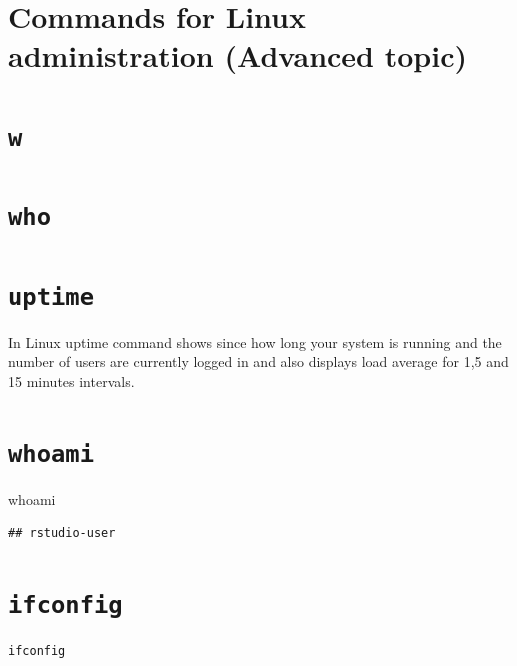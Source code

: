 \documentclass[]{book}
\makeatletter
\newenvironment{Shaded}{\begin{snugshade}}{\end{snugshade}}
\newcommand{\FunctionTok}[1]{\textcolor[rgb]{0.00,0.00,0.00}{#1}}
\newenvironment{kframe}{%
\medskip{}
\setlength{\fboxsep}{.8em}
 \def\at@end@of@kframe{}%
 \ifinner\ifhmode%
  \def\at@end@of@kframe{\end{minipage}}%
  \begin{minipage}{\columnwidth}%
 \fi\fi%
 \def\FrameCommand##1{\hskip\@totalleftmargin \hskip-\fboxsep
 \colorbox{shadecolor}{##1}\hskip-\fboxsep
     \hskip-\linewidth \hskip-\@totalleftmargin \hskip\columnwidth}%
 \MakeFramed {\advance\hsize-\width
   \@totalleftmargin\z@ \linewidth\hsize
   \@setminipage}}%
 {\par\unskip\endMakeFramed%
 \at@end@of@kframe}
\renewenvironment{Shaded}{\begin{kframe}}{\end{kframe}}
\makeatother
\begin{document}
\hypertarget{commands-for-linux-administration-advanced-topic}{%
\section{Commands for Linux administration (Advanced topic)}\label{commands-for-linux-administration-advanced-topic}}

\hypertarget{w}{%
\section{\texorpdfstring{\texttt{w}}{w}}\label{w}}

\hypertarget{who}{%
\section{\texorpdfstring{\texttt{who}}{who}}\label{who}}

\hypertarget{uptime}{%
\section{\texorpdfstring{\texttt{uptime}}{uptime}}\label{uptime}}

In Linux uptime command shows since how long your system is running and the number of users are currently logged in and also displays load average for 1,5 and 15 minutes intervals.

\hypertarget{whoami}{%
\section{\texorpdfstring{\texttt{whoami}}{whoami}}\label{whoami}}

\begin{Shaded}
\begin{Highlighting}[]
\FunctionTok{whoami}
\end{Highlighting}
\end{Shaded}

\begin{verbatim}
## rstudio-user
\end{verbatim}

\hypertarget{ifconfig}{%
\section{\texorpdfstring{\texttt{ifconfig}}{ifconfig}}\label{ifconfig}}

\begin{verbatim}
ifconfig
\end{verbatim}
\end{document}
